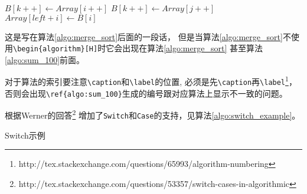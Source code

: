 \begin{algorithm}
\begin{algorithmic}[1]
    \State $B[k++] \gets Array[i++]$
  \EndWhile
    \State $B[k++] \gets Array[j++]$
  \EndWhile
    \State $Array[left + i] \gets B[i]$
  \EndFor
  \State {}
\EndFunction
\end{algorithmic}
\end{algorithm}

这是写在算法\ref{algo:merge_sort}后面的一段话，
但是当算法\ref{algo:merge_sort}不使用\verb+\begin{algorithm}[H]+时它会出现在算法\ref{algo:merge_sort}
甚至算法\ref{algo:sum_100}前面。

对于算法的索引要注意\verb+\caption+和\verb+\label+的位置,
必须是先\verb+\caption+再\verb+\label+\footnote{http://tex.stackexchange.com/questions/65993/algorithm-numbering}，
否则会出现\verb+\ref{algo:sum_100}+生成的编号跟对应算法上显示不一致的问题。

根据Werner的回答\footnote{http://tex.stackexchange.com/questions/53357/switch-cases-in-algorithmic}
增加了\verb+Switch+和\verb+Case+的支持，见算法\ref{algo:switch_example}。

\begin{algorithm}
\caption{Switch示例}
\label{algo:switch_example}
\begin{algorithmic}[1]
    \EndCase
    \EndCase
    \Default
    \EndDefault
  \EndSwitch
\end{algorithmic}
\end{algorithm}
